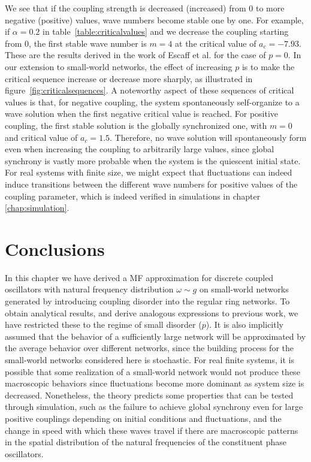 \noindent We see that if the coupling strength is decreased (increased) from 0 to more negative (positive) values, wave numbers become
stable one by one. For example, if $\alpha=0.2$ in table~\ref{table:criticalvalues} and we decrease the coupling starting from 0, the
first stable wave number is $m=4$ at the critical value of $a_c=-7.93$. These are the results derived in the work of Escaff et
al.\cite{escaff2014arrays} for the case of $p=0$. In our extension to small-world networks, the effect of increasing $p$ is to make the
critical sequence increase or decrease more sharply, as illustrated in figure~\ref{fig:criticalsequences}. A noteworthy aspect of these
sequences of critical values is that, for negative coupling, the system spontaneously self-organize to a wave solution when the first
negative critical value is reached. For positive coupling, the first stable solution is the globally synchronized one, with $m=0$ and
critical value of $a_c=1.5$\cite{Wood06a,Wood06b,assis2011infinite,rodrigues2020synchronization}. Therefore, no wave solution will
spontaneously form even when increasing the coupling to arbitrarily large values, since global synchrony is vastly more probable when
the system is the quiescent initial state\cite{rodrigues2020synchronization}. For real systems with finite size, we might expect that
fluctuations can indeed induce transitions between the different wave numbers for positive values of the coupling parameter, which is
indeed verified in simulations in chapter \ref{chap:simulation}.

\section{Conclusions} In this chapter we have derived a MF approximation for discrete coupled oscillators with natural frequency
distribution $\omega\sim g$ on small-world networks generated by introducing coupling disorder into the regular ring networks. To
obtain analytical results, and derive analogous expressions to previous work, we have restricted these to the regime of small disorder
($p$). It is also implicitly assumed that the behavior of a sufficiently large network will be approximated by the average behavior
over different networks, since the building process for the small-world networks considered here is stochastic. For real finite
systems, it is possible that some realization of a small-world network would not produce these macroscopic behaviors since fluctuations
become more dominant as system size is decreased. Nonetheless, the theory predicts some properties that can be tested through
simulation, such as the failure to achieve global synchrony even for large positive couplings depending on initial conditions and
fluctuations, and the change in speed with which these waves travel if there are macroscopic patterns in the spatial distribution of
the natural frequencies of the constituent phase oscillators.
